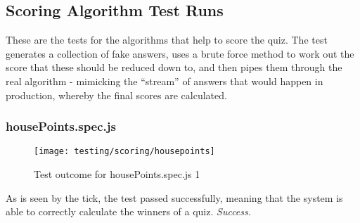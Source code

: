 \subsection{Scoring Algorithm Test Runs}
These are the tests for the algorithms that help to score the quiz. The test generates a collection of fake answers, uses a brute force method to work out the score that these should be reduced down to, and then pipes them through the real algorithm - mimicking the ``stream'' of answers that would happen in production, whereby the final scores are calculated.

\subsubsection{housePoints.spec.js} %
\label{ssub:housepoints_spec_js}

\begin{figure}[h!]
  \texttt{[image: testing/scoring/housepoints]}
  \caption{Test outcome for housePoints.spec.js 1}
\end{figure}

As is seen by the tick, the test passed successfully, meaning that the system is able to correctly calculate the winners of a quiz. \textit{Success.}

